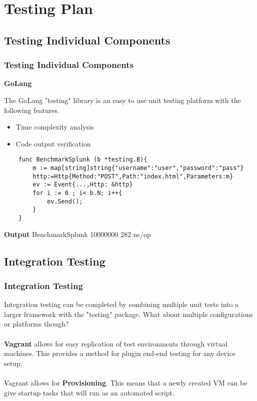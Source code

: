 \section{Testing Plan}

\subsection{Testing Individual Components}
\begin{frame}[fragile]
\frametitle{Testing Individual Components}
	\textbf{GoLang}
	
	The GoLang "testing" library is an easy to use unit testing platform with the following features.
	\begin{itemize} %
	\item Time complexity analysis
	\item Code output verification
	\end{itemize}

	\begin{example} %
	\begin{verbatim}
	func BenchmarkSplunk (b *testing.B){
		m := map[string]string{"username":"user","password":"pass"}
		http:=Http{Method:"POST",Path:"index.html",Parameters:m}
		ev := Event{...,Http: &http}
		for i := 0 ; i< b.N; i++{
			ev.Send();
		}
	}
	\end{verbatim}
	\end{example}
	\textbf{Output}
	BenchmarkSplunk    10000000    282 ns/op
\end{frame}

\subsection{Integration Testing}
\begin{frame}
\frametitle{Integration Testing}
Integration testing can be completed by combining multiple unit tests into a larger framework with the "testing" package. 
What about multiple configurations or platforms though?\\~\\
\textbf {Vagrant} allows for easy replication of test environments through virtual machines. This provides a method for plugin end-end testing for any device setup. \\~\\


Vagrant allows for \textbf{Provisioning}. This means that a newly created VM can be give startup tasks that will run as an automated script.

\end{frame}

